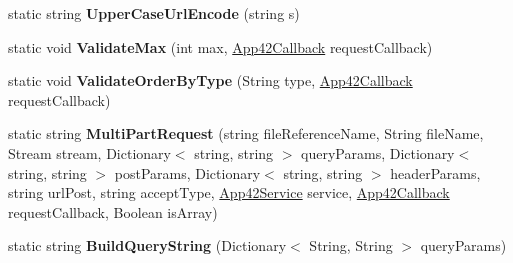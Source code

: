 \begin{DoxyCompactItemize}
\item 
\hypertarget{classcom_1_1shephertz_1_1app42_1_1paas_1_1sdk_1_1windows_1_1util_1_1_util_aa75c3fa4a4aa2a750b204c5e357b64aa}{static string {\bfseries Upper\+Case\+Url\+Encode} (string s)}\label{classcom_1_1shephertz_1_1app42_1_1paas_1_1sdk_1_1windows_1_1util_1_1_util_aa75c3fa4a4aa2a750b204c5e357b64aa}

\item 
\hypertarget{classcom_1_1shephertz_1_1app42_1_1paas_1_1sdk_1_1windows_1_1util_1_1_util_a5c491eb9453b76a3bb237800c41f790a}{static void {\bfseries Validate\+Max} (int max, \hyperlink{interfacecom_1_1shephertz_1_1app42_1_1paas_1_1sdk_1_1windows_1_1_app42_callback}{App42\+Callback} request\+Callback)}\label{classcom_1_1shephertz_1_1app42_1_1paas_1_1sdk_1_1windows_1_1util_1_1_util_a5c491eb9453b76a3bb237800c41f790a}

\item 
\hypertarget{classcom_1_1shephertz_1_1app42_1_1paas_1_1sdk_1_1windows_1_1util_1_1_util_a8a6ecf95d5ecd43e68faa47cae76bca7}{static void {\bfseries Validate\+Order\+By\+Type} (String type, \hyperlink{interfacecom_1_1shephertz_1_1app42_1_1paas_1_1sdk_1_1windows_1_1_app42_callback}{App42\+Callback} request\+Callback)}\label{classcom_1_1shephertz_1_1app42_1_1paas_1_1sdk_1_1windows_1_1util_1_1_util_a8a6ecf95d5ecd43e68faa47cae76bca7}

\item 
\hypertarget{classcom_1_1shephertz_1_1app42_1_1paas_1_1sdk_1_1windows_1_1util_1_1_util_a983a2f0b964a8ab8270644940d0cd5db}{static string {\bfseries Multi\+Part\+Request} (string file\+Reference\+Name, String file\+Name, Stream stream, Dictionary$<$ string, string $>$ query\+Params, Dictionary$<$ string, string $>$ post\+Params, Dictionary$<$ string, string $>$ header\+Params, string url\+Post, string accept\+Type, \hyperlink{classcom_1_1shephertz_1_1app42_1_1paas_1_1sdk_1_1windows_1_1_app42_service}{App42\+Service} service, \hyperlink{interfacecom_1_1shephertz_1_1app42_1_1paas_1_1sdk_1_1windows_1_1_app42_callback}{App42\+Callback} request\+Callback, Boolean is\+Array)}\label{classcom_1_1shephertz_1_1app42_1_1paas_1_1sdk_1_1windows_1_1util_1_1_util_a983a2f0b964a8ab8270644940d0cd5db}

\item 
\hypertarget{classcom_1_1shephertz_1_1app42_1_1paas_1_1sdk_1_1windows_1_1util_1_1_util_ace4bdd54c4aca315ce8705ee3f5aca64}{static string {\bfseries Build\+Query\+String} (Dictionary$<$ String, String $>$ query\+Params)}\label{classcom_1_1shephertz_1_1app42_1_1paas_1_1sdk_1_1windows_1_1util_1_1_util_ace4bdd54c4aca315ce8705ee3f5aca64}

\end{DoxyCompactItemize}
